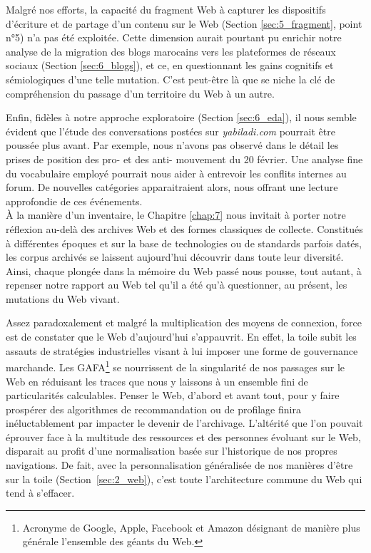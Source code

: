 \documentclass[symmetric,justified,marginals=raggedouter]{tufte-book}
\begin{document}
Malgré nos efforts, la capacité du fragment Web à capturer les dispositifs d'écriture et de partage d'un contenu sur le Web (Section \ref{sec:5_fragment}, point n°5) n'a pas été exploitée. Cette dimension aurait pourtant pu enrichir notre analyse de la migration des blogs marocains vers les plateformes de réseaux sociaux (Section \ref{sec:6_blogs}), et ce, en questionnant les gains cognitifs et sémiologiques d'une telle mutation. C'est peut-être là que se niche la clé de compréhension du passage d'un territoire du Web à un autre.   

Enfin, fidèles à notre approche exploratoire (Section \ref{sec:6_eda}), il nous semble évident que l'étude des conversations postées sur \textit{yabiladi.com} pourrait être poussée plus avant. Par exemple, nous n'avons pas observé dans le détail les prises de position des pro- et des anti- mouvement du 20 février. Une analyse fine du vocabulaire employé pourrait nous aider à entrevoir les conflits internes au forum. De nouvelles catégories apparaitraient alors, nous offrant une lecture approfondie de ces événements.\\

\noindent À la manière d'un inventaire, le Chapitre \ref{chap:7} nous invitait à porter notre réflexion au-delà des archives Web et des formes classiques de collecte. Constitués à différentes époques et sur la base de technologies ou de standards parfois datés, les corpus archivés se laissent aujourd'hui découvrir dans toute leur diversité. Ainsi, chaque plongée dans la mémoire du Web passé nous pousse, tout autant, à repenser notre rapport au Web tel qu'il a été qu'à questionner, au présent, les mutations du Web vivant.

Assez paradoxalement et malgré la multiplication des moyens de connexion, force est de constater que le Web d'aujourd'hui s'appauvrit. En effet, la toile subit les assauts de stratégies industrielles visant à lui imposer une forme de gouvernance marchande. Les GAFA\footnote{\RaggedOuter Acronyme de Google, Apple, Facebook et Amazon désignant de manière plus générale l'ensemble des géants du Web.} se nourrissent de la singularité de nos passages sur le Web en réduisant les traces que nous y laissons à un ensemble fini de particularités calculables. Penser le Web, d'abord et avant tout, pour y faire prospérer des algorithmes de recommandation ou de profilage finira inéluctablement par impacter le devenir de l'archivage. L'altérité que l'on pouvait éprouver face à la multitude des ressources et des personnes évoluant sur le Web, disparait au profit d'une normalisation basée sur l'historique de nos propres navigations. De fait, avec la personnalisation généralisée de nos manières d'être sur la toile (Section~\ref{sec:2_web}), c'est toute l'architecture commune du Web qui tend à s'effacer.
\end{document}
